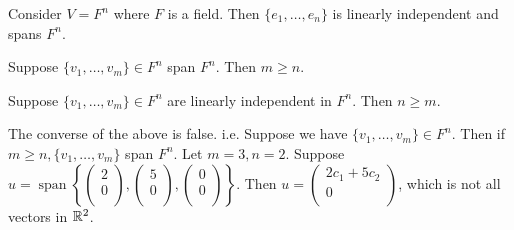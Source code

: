 \documentclass{article}
\DeclareMathOperator{\spn}{span}
\begin{document}
  \begin{corollary}
    Consider $V = F^n$ where $F$ is a field. Then $\{e_1, \ldots, e_n\}$ is linearly independent and spans $F^n$.

    Suppose $\{v_1, \ldots, v_m\} \in F^n$ span $F^n$. Then $m \geq n$.

    Suppose $\{v_1, \ldots, v_m\} \in F^n$ are linearly independent in $F^n$. Then $n \geq m$.

    The converse of the above is false.
    i.e. Suppose we have $\{v_1, \ldots, v_m\} \in F^n$. Then if $m \geq n, \{v_1, \ldots, v_m\}$ span $F^n$.
    Let $m = 3, n = 2$. Suppose $u = \spn\left\{
      \begin{pmatrix}
        2\\0\\
      \end{pmatrix},
      \begin{pmatrix}
        5\\0\\
      \end{pmatrix},
      \begin{pmatrix}
        0\\0\\
    \end{pmatrix}\right\}$. Then $u =
    \begin{pmatrix}2c_1 + 5c_2\\ 0\\
    \end{pmatrix}$, which is not all vectors in $\mathbb{R}^2$.
  \end{corollary}
\end{document}
